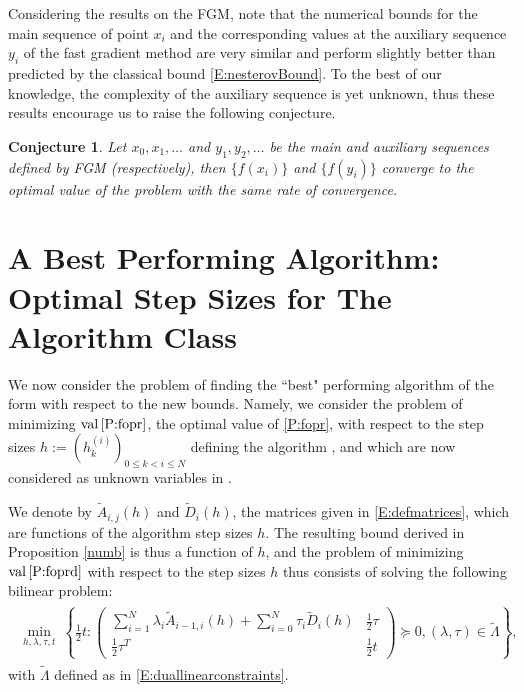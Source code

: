 \documentclass[12pt]{article}
\numberwithin{equation}{section}
\newtheorem{conjecture}{Conjecture}[section]
\theoremstyle{definition}
\theoremstyle{remark}
\DeclareMathOperator{\val}{val}
\newcommand{\mainalg}{\text{FO}\xspace}
\begin{document}
Considering the results on the FGM,
note that the numerical bounds for the main sequence of point $x_i$ and the corresponding
values at the auxiliary sequence $y_i$ of the fast gradient method are very similar and
perform slightly better than predicted by the classical bound \eqref{E:nesterovBound}.
To the best of our knowledge, the complexity of the auxiliary sequence is yet unknown,
thus these results encourage us to raise the following conjecture.
\begin{conjecture}\label{conj:xy}
Let $x_0,x_1,\dots$ and $y_1,y_2,\dots$ be the main and auxiliary sequences defined by FGM
(respectively), then $\{f(x_i)\}$ and $\{f(y_i)\}$ converge to the optimal value of the problem
with the same rate of convergence.
\end{conjecture}





\section{A Best Performing Algorithm: Optimal Step Sizes for The Algorithm Class \mainalg}\label{S:optalg}

We now consider the problem of finding the ``best" performing algorithm of the form \mainalg
with respect to the new bounds. Namely, we consider the problem of minimizing
$\val\eqref{P:fopr}$, the optimal value of \eqref{P:fopr},
with respect to the step sizes $h:=(h^{(i)}_k)_{0\leq k<i \leq N}$
defining the algorithm \mainalg, and which are now considered as unknown variables in
\mainalg.


We denote by  $\tilde{A}_{i,j}(h)$ and $\tilde{D}_i(h)$, the matrices given in
\eqref{E:defmatrices},  which are functions of the algorithm step sizes $h$. The resulting
bound derived in Proposition \ref{numb} is thus a function of $h$, and the problem of
minimizing $\val \eqref{P:foprd}$ with respect to the step sizes $h$ thus consists of solving
the following bilinear problem: {\small
\begin{align*}
    \begin{aligned}
    \min_{h,\lambda, \tau,t}\ \left \{ \frac{1}{2} t :
           \begin{pmatrix}
                \sum_{i=1}^N \lambda_i  \tilde{A}_{i-1,i}(h)  + \sum_{i=0}^N \tau_i  \tilde{D}_i(h)  &\frac{1}{2} \tau \\
                \frac{1}{2} \tau^T      & \frac{1}{2} t
        \end{pmatrix} \succeq 0,
         (\lambda, \tau) \in \tilde{\Lambda} \right\},
    \end{aligned}
    \tag{BIL}\label{P:pblin}
\end{align*}
} with $\tilde{\Lambda}$ defined as in \eqref{E:duallinearconstraints}.
\end{document}
